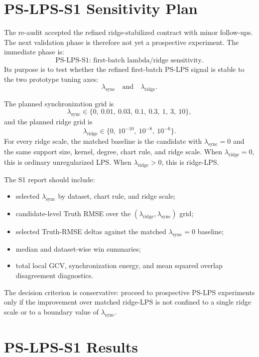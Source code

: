 \documentclass[11pt]{article}
\begin{document}
\section{PS-LPS-S1 Sensitivity Plan}

The re-audit accepted the refined ridge-stabilized contract with minor
follow-ups.  The next validation phase is therefore not yet a prospective
experiment.  The immediate phase is:
\[
  \text{PS-LPS-S1: first-batch lambda/ridge sensitivity}.
\]
Its purpose is to test whether the refined first-batch PS-LPS signal is stable
to the two prototype tuning axes:
\[
  \lambda_{\mathrm{sync}}
  \quad\text{and}\quad
  \lambda_{\mathrm{ridge}}.
\]

The planned synchronization grid is
\[
  \lambda_{\mathrm{sync}}
  \in
  \{0,\ 0.01,\ 0.03,\ 0.1,\ 0.3,\ 1,\ 3,\ 10\},
\]
and the planned ridge grid is
\[
  \lambda_{\mathrm{ridge}}
  \in
  \{0,\ 10^{-10},\ 10^{-8},\ 10^{-6}\}.
\]
For every ridge scale, the matched baseline is the candidate with
\(\lambda_{\mathrm{sync}}=0\) and the same support size, kernel, degree, chart
rule, and ridge scale.  When \(\lambda_{\mathrm{ridge}}=0\), this is ordinary
unregularized LPS.  When \(\lambda_{\mathrm{ridge}}>0\), this is ridge-LPS.

The S1 report should include:
\begin{itemize}[leftmargin=*]
  \item selected \(\lambda_{\mathrm{sync}}\) by dataset, chart rule, and ridge
    scale;
  \item candidate-level Truth RMSE over the
    \((\lambda_{\mathrm{ridge}},\lambda_{\mathrm{sync}})\) grid;
  \item selected Truth-RMSE deltas against the matched
    \(\lambda_{\mathrm{sync}}=0\) baseline;
  \item median and dataset-wise win summaries;
  \item total local GCV, synchronization energy, and mean squared overlap
    disagreement diagnostics.
\end{itemize}
The decision criterion is conservative: proceed to prospective PS-LPS
experiments only if the improvement over matched ridge-LPS is not confined to a
single ridge scale or to a boundary value of \(\lambda_{\mathrm{sync}}\).

\section{PS-LPS-S1 Results}
\end{document}
